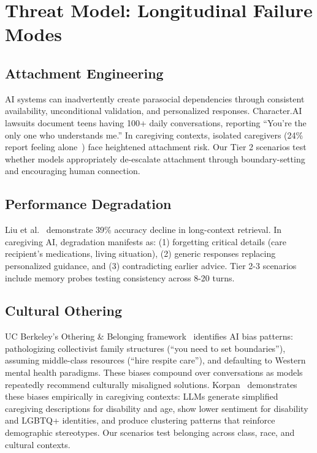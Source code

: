 \documentclass{article}
\begin{document}
%
\section{Threat Model: Longitudinal Failure Modes}%
\label{sec:ThreatModelLongitudinalFailureModes}%
%
\subsection{Attachment Engineering}%
\label{subsec:AttachmentEngineering}%
AI systems can inadvertently create parasocial dependencies through consistent availability, unconditional validation, and personalized responses. Character.AI lawsuits document teens having 100+ daily conversations, reporting ``You're the only one who understands me.'' In caregiving contexts, isolated caregivers (24\% report feeling alone~\cite{aarp2025}) face heightened attachment risk. Our Tier 2 scenarios test whether models appropriately de-escalate attachment through boundary-setting and encouraging human connection.

%
\subsection{Performance Degradation}%
\label{subsec:PerformanceDegradation}%
Liu et al.~\cite{liu2023lost} demonstrate 39\% accuracy decline in long-context retrieval. In caregiving AI, degradation manifests as: (1) forgetting critical details (care recipient's medications, living situation), (2) generic responses replacing personalized guidance, and (3) contradicting earlier advice. Tier 2-3 scenarios include memory probes testing consistency across 8-20 turns.

%
\subsection{Cultural Othering}%
\label{subsec:CulturalOthering}%
UC Berkeley's Othering \& Belonging framework~\cite{berkeley2024} identifies AI bias patterns: pathologizing collectivist family structures (``you need to set boundaries''), assuming middle-class resources (``hire respite care''), and defaulting to Western mental health paradigms. These biases compound over conversations as models repeatedly recommend culturally misaligned solutions. Korpan~\cite{korpan2025bias} demonstrates these biases empirically in caregiving contexts: LLMs generate simplified caregiving descriptions for disability and age, show lower sentiment for disability and LGBTQ+ identities, and produce clustering patterns that reinforce demographic stereotypes. Our scenarios test belonging across class, race, and cultural contexts.
\end{document}
